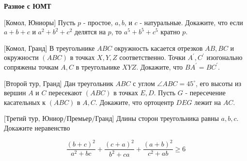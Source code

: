 \centerline{\bf \Huge Разное с ЮМТ}
\centerline{\bf \Huge }

\begin{flushright}
        \scriptsize{}
\end{flushright}

$\bigl[\textbf{Комол, Юниоры}\bigr]$
Пусть $p$ - простое, $a, b$, и $c$ - натуральные. Докажите, что если $a+b+c$ и $a^2+b^2+c^2$ делятся на $p$, то $a^5+b^5+c^5$ кратно $p$.

$\bigl[\textbf{Комол, Гранд}\bigr]$
В треугольнике $A B C$ окружность касается отрезков $A B, B C$ и окружности $(A B C)$ в точках $X, Y, Z$ соответственно. Точки $A^{\prime}, C^{\prime}$ изогонально сопряжены точкам $A, C$ в треугольнике $X Y Z$. Докажите, что $B A^{\prime}=B C^{\prime}$.

$\bigl[\textbf{Второй тур, Гранд}\bigr]$
Дан треугольник $A B C$ с углом $\angle A B C=45^{\circ}$, его высоты из вершин $A$ и $C$ пересекают $(A B C)$ в точках $E, D$. Пусть $G$ - пересечение касательных к $(A B C)$ в $A, C$. Докажите, что ортоцентр $D E G$ лежит на $A C$.

$\bigl[\textbf{Третий тур, Юниор/Премьер/Гранд}\bigr]$
Длины сторон треугольника равны $a, b, c$. Докажите неравенство

$$
\frac{(b+c)^2}{a^2+b c}+\frac{(c+a)^2}{b^2+c a}+\frac{(a+b)^2}{c^2+a b} \geq 6
$$  